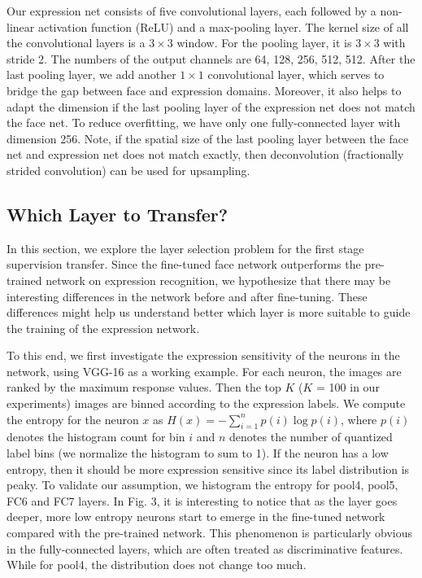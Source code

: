 \documentclass[a4paper, 10pt, conference]{ieeeconf}      %
\begin{document}
Our expression net consists of five convolutional layers, each followed by a non-linear activation function (ReLU)  and a max-pooling layer. The kernel size of all the convolutional layers is a $3 \times 3$ window. For the pooling layer, it is $3 \times 3$ with stride 2. The numbers of the output channels are 64, 128, 256, 512, 512. After the last pooling layer, we add another $1 \times 1$ convolutional layer, which serves to bridge the gap between face and expression domains. Moreover, it also helps to adapt the dimension if the last pooling layer of the expression net does not match the face net.
To reduce overfitting, we have only one fully-connected layer with dimension 256. 
Note, if the spatial size of the last pooling layer between the face net and expression net does not match exactly, then deconvolution (fractionally strided convolution) can be used for upsampling.









\subsection{Which Layer to Transfer?}
In this section, we explore the layer selection problem for the first stage supervision transfer. Since the fine-tuned face network outperforms the pre-trained network on expression recognition, we hypothesize that there may be interesting differences in the network before and after fine-tuning. These differences might help us understand better which layer is more suitable to guide the training of the expression network. 

To this end, we first investigate the expression sensitivity of the neurons in the network, using VGG-16 as a working example. For each neuron, the images are ranked by the maximum response values. Then the top $K$ ($K$ = 100 in our experiments) images are binned according to the expression labels. We compute the entropy for the neuron  $x$ as $H(x) = - \sum_{i=1}^n p(i) \log p(i)$, where $p(i)$ denotes the histogram count for bin $i$ and $n$ denotes the number of quantized label bins (we normalize the histogram to sum to 1). If the neuron has a low entropy, then it should be more expression sensitive since its label distribution is peaky. To validate our assumption, we histogram the entropy for pool4, pool5, FC6 and FC7 layers. In Fig. 3, it is interesting to notice that as the layer goes deeper, more low entropy neurons start to emerge in the fine-tuned network compared with the pre-trained network. This phenomenon is particularly obvious in the fully-connected layers, which are often treated as discriminative features. While for pool4, the distribution does not change too much. 
\end{document}
